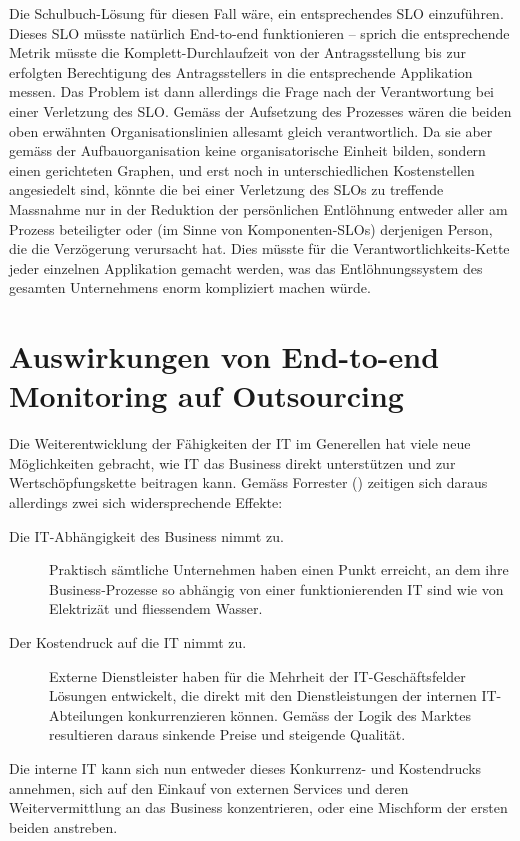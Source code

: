 \documentclass[11pt,listof=totoc]{scrreprt} %
\theoremstyle{definition}
\begin{document}
Die Schulbuch-Lösung für diesen Fall wäre, ein entsprechendes SLO einzuführen. Dieses SLO müsste natürlich End-to-end funktionieren -- sprich die entsprechende Metrik müsste die Komplett-Durchlaufzeit von der Antragsstellung bis zur erfolgten Berechtigung des Antragsstellers in die entsprechende Applikation messen. Das Problem ist dann allerdings die Frage nach der Verantwortung bei einer Verletzung des SLO. Gemäss der Aufsetzung des Prozesses wären die beiden oben erwähnten Organisationslinien allesamt gleich verantwortlich. Da sie aber gemäss der Aufbauorganisation keine organisatorische Einheit bilden, sondern einen gerichteten Graphen, und erst noch in unterschiedlichen Kostenstellen angesiedelt sind, könnte die bei einer Verletzung des SLOs zu treffende Massnahme nur in der Reduktion der persönlichen Entlöhnung entweder aller am Prozess beteiligter oder (im Sinne von Komponenten-SLOs) derjenigen Person, die die Verzögerung verursacht hat. Dies müsste für die Verantwortlichkeits-Kette jeder einzelnen Applikation gemacht werden, was das Entlöhnungssystem des gesamten Unternehmens enorm kompliziert machen würde.

\section{Auswirkungen von End-to-end Monitoring auf Outsourcing}

Die Weiterentwicklung der Fähigkeiten der IT im Generellen hat viele neue Möglichkeiten gebracht, wie IT das Business direkt unterstützen und zur Wertschöpfungskette beitragen kann. Gemäss Forrester (\cite{forrester:slaBestPractices}) zeitigen sich daraus allerdings zwei sich widersprechende Effekte:

\begin{description}
\item[Die IT-Abhängigkeit des Business nimmt zu.] Praktisch sämtliche Unternehmen haben einen Punkt erreicht, an dem ihre Business-Prozesse so abhängig von einer funktionierenden IT sind wie von Elektrizät und fliessendem Wasser.
\item[Der Kostendruck auf die IT nimmt zu.] Externe Dienstleister haben für die Mehrheit der IT-Geschäftsfelder Lösungen entwickelt, die direkt mit den Dienstleistungen der internen IT-Abteilungen konkurrenzieren können. Gemäss der Logik des Marktes resultieren daraus sinkende Preise und steigende Qualität.
\end{description}

Die interne IT kann sich nun entweder dieses Konkurrenz- und Kostendrucks annehmen, sich auf den Einkauf von externen Services und deren Weitervermittlung an das Business konzentrieren, oder eine Mischform der ersten beiden anstreben.
\end{document}
